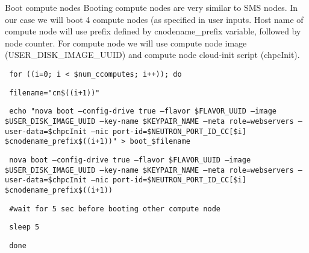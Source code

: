 \documentclass[12pt]{article}
\begin{document}
Boot compute nodes
Booting compute nodes are very similar to SMS nodes. In our case we will boot 4 compute nodes (as specified in user inputs. Host name of compute node will use prefix defined by cnodename\_prefix variable, followed by node counter. For compute node we will use compute node image (USER\_DISK\_IMAGE\_UUID) and compute node cloud-init script (chpcInit). 

\begin{bash}\texttt{\small{ for ((i=0; i < \${num\_ccomputes}; i++)); do}}\end{bash}
\begin{bash}\texttt{\small{         filename="cn\$((i+1))"}}\end{bash}
\begin{bash}\texttt{\small{         echo "nova boot --config-drive true --flavor \${FLAVOR\_UUID} --image \${USER\_DISK\_IMAGE\_UUID} --key-name \${KEYPAIR\_NAME} --meta role=webservers --user-data=\$chpcInit --nic port-id=\${NEUTRON\_PORT\_ID\_CC[\$i]} \${cnodename\_prefix}\$((i+1))" > boot\_\$filename}}\end{bash}
\begin{bash}\texttt{\small{         nova boot --config-drive true --flavor \${FLAVOR\_UUID} --image \${USER\_DISK\_IMAGE\_UUID} --key-name \${KEYPAIR\_NAME} --meta role=webservers --user-data=\$chpcInit --nic port-id=\${NEUTRON\_PORT\_ID\_CC[\$i]} \${cnodename\_prefix}\$((i+1))}}\end{bash}
\begin{bash}\texttt{\small{         \#wait for 5 sec before booting other compute node}}\end{bash}
\begin{bash}\texttt{\small{         sleep 5}}\end{bash}
\begin{bash}\texttt{\small{     done}}\end{bash}
\end{document}
